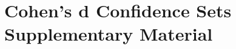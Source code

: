 \documentclass[11pt,a4paper]{report}
\begin{document}
\chapter{Cohen's d Confidence Sets Supplementary Material}





\end{document}
